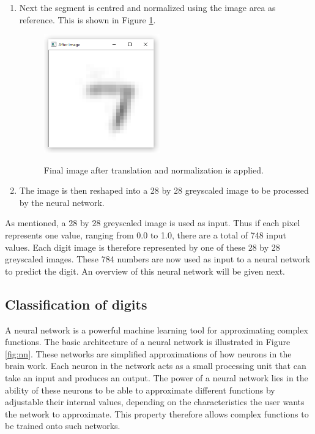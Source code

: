 \begin{enumerate}
\item Next the segment is centred and normalized using the image area as reference.  This is shown in Figure \ref{fig:final}.

\begin{figure}
  \centering
  \includegraphics[width=5cm]{TranslateAndScale}\\
  \caption{Final image after translation and normalization is applied.}
  \label{fig:final}
\end{figure}

\item The image is then reshaped into a 28 by 28 greyscaled image to be processed by the neural network.
\end{enumerate}
As mentioned, a 28 by 28 greyscaled image is used as input. Thus if each pixel represents one value, ranging from 0.0 to 1.0, there are a total of 748 input values. Each digit image is therefore represented by  one of these 28 by 28 greyscaled images. These 784 numbers are now used as input to a neural network to predict the digit. An overview of this neural network will be given next.

\subsection{Classification of digits}

A neural network is a powerful machine learning tool for approximating complex functions. The basic architecture of a neural network is illustrated in Figure \ref{fig:nn}. These networks are simplified approximations of how neurons in the brain work. Each neuron in the network acts as a small processing unit that can take an input and produces an output. The power of a neural network lies in the ability of these neurons to be able to approximate different functions by adjustable their internal values, depending on the characteristics the user wants the network to approximate. This property therefore allows complex functions to be trained onto such networks.

